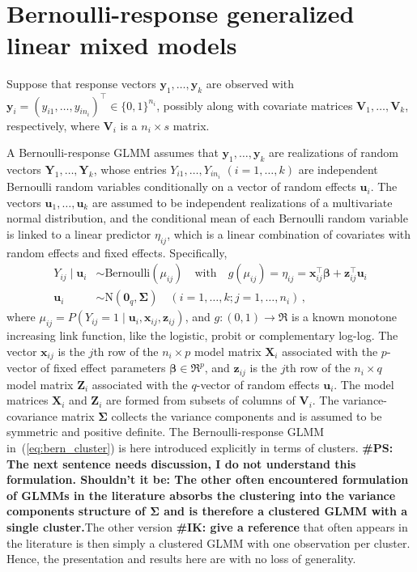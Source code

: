 \documentclass[11pt, a4paper]{article}
\newcommand*{\bb}{\boldsymbol}
\newcommand{\IK}[1]{{\noindent \color{blue} \bf \#IK: #1}}
\newcommand{\PS}[1]{{\noindent \color{red} \bf \#PS: #1}}
\theoremstyle{example} \newtheorem{example}{Example}[section]
\theoremstyle{theorem} \newtheorem{theorem}{Theorem}[section]
\def\bbeta{\bb{\beta}}
\def\bSigma{\bb{\Sigma}}
\def\by{\bb{y}}
\def\bY{\bb{Y}}
\def\bu{\bb{u}}
\def\bx{\bb{x}}
\def\bz{\bb{z}}
\def\b0{\bb{0}}
\def\bX{\bb{X}}
\def\bZ{\bb{Z}}
\def\bV{\bb{V}}
\def\bY{\bb{Y}}
\def\by{\bb{y}}
\begin{document}
\section{Bernoulli-response generalized linear mixed models}
\label{sec:bern_GLMMs}

Suppose that response vectors $\by_1, \ldots, \by_k$ are observed with
$\by_i = (y_{i1}, \ldots, y_{in_i})^\top \in \{0, 1\}^{n_i}$, possibly
along with covariate matrices $\bV_1, \ldots, \bV_k$, respectively,
where $\bV_i$ is a $n_i \times s$ matrix.

A Bernoulli-response GLMM assumes that $\by_1, \ldots, \by_k$
are realizations of random vectors $\bY_1, \ldots, \bY_k$, whose entries
$Y_{i1}, \ldots, Y_{in_i}$ $(i = 1, \ldots, k)$ are independent
Bernoulli random variables conditionally on a vector of random effects
$\bu_i$. The vectors $\bu_1, \ldots, \bu_k$ are assumed to be
independent realizations of a multivariate normal distribution, and the conditional mean of each Bernoulli random
variable is linked to a linear predictor $\eta_{ij}$, which is a
linear combination of covariates with random effects and fixed effects.
Specifically,
\begin{align}
\label{eq:bern_cluster}
  Y_{ij} \mid \bb{u}_i & \sim \text{Bernoulli}(\mu_{ij}) \quad \text{with} \quad
  g(\mu_{ij}) = \eta_{ij} = \bx_{ij}^\top \bbeta + \bz_{ij}^\top \bu_i\\
  \bu_i & \sim \text{N}(\b0_q, \bb{\Sigma})  \quad (i = 1, \ldots, k; j = 1, \ldots, n_i)\,,
\end{align}
where $\mu_{ij} = P(Y_{ij} = 1 \mid \bu_i, \bx_{ij}, \bz_{ij})$, and
$g: (0, 1) \to \Re$ is a known monotone increasing link function, like
the logistic, probit or complementary log-log. The vector $\bx_{ij}$
is the $j$th row of the $n_i \times p$ model matrix $\bX_{i}$
associated with the $p$-vector of fixed effect parameters
$\bbeta \in \Re^p$, and $\bz_{ij}$ is the $j$th row of the
$n_i \times q$ model matrix $\bZ_{i}$ associated with the $q$-vector
of random effects $\bu_i$. The model matrices $\bX_i$ and $\bZ_i$ are
formed from subsets of columns of $\bV_i$. The variance-covariance
matrix $\bSigma$ collects the variance components and is assumed to be
symmetric and positive definite. The Bernoulli-response GLMM
in~(\ref{eq:bern_cluster}) is here introduced explicitly in terms of
clusters. \PS{The next sentence needs discussion, I do not understand this formulation. Shouldn't it be: The other often encountered formulation of GLMMs in the literature \citep[Chapter 7.4]{mcculloch2004generalized} absorbs the clustering into the variance components structure of $\bSigma$ and is therefore a clustered GLMM with a single cluster.}The other version \IK{give a reference} that often appears
in the literature is then simply a clustered GLMM with one observation
per cluster. Hence, the presentation and results here are with no loss
of generality.
\end{document}
